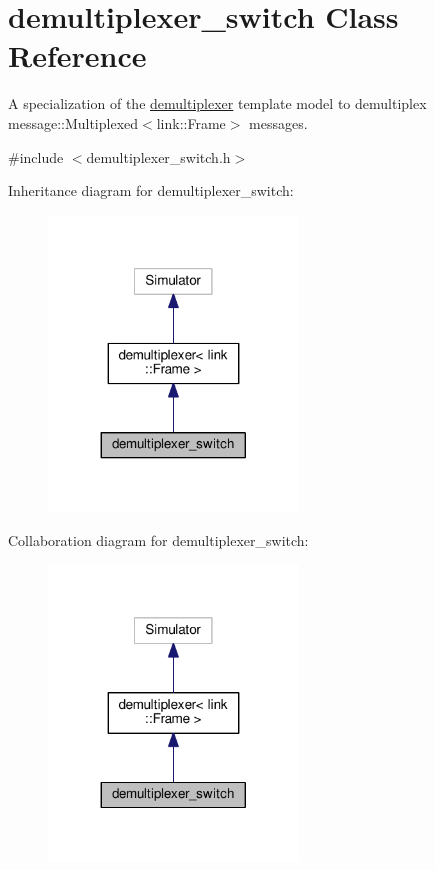 \hypertarget{classdemultiplexer__switch}{}\section{demultiplexer\+\_\+switch Class Reference}
\label{classdemultiplexer__switch}


A specialization of the \hyperlink{classdemultiplexer}{demultiplexer} template model to demultiplex message\+::\+Multiplexed$<$link\+::\+Frame$>$ messages.  




{\ttfamily \#include $<$demultiplexer\+\_\+switch.\+h$>$}



Inheritance diagram for demultiplexer\+\_\+switch\+:\nopagebreak
\begin{figure}[H]
\begin{center}
\leavevmode
\includegraphics[width=188pt]{classdemultiplexer__switch__inherit__graph}
\end{center}
\end{figure}


Collaboration diagram for demultiplexer\+\_\+switch\+:\nopagebreak
\begin{figure}[H]
\begin{center}
\leavevmode
\includegraphics[width=188pt]{classdemultiplexer__switch__coll__graph}
\end{center}
\end{figure}
